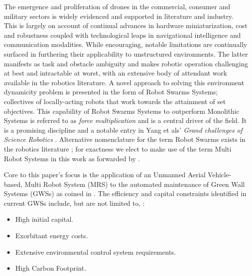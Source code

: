 \documentclass{report}
\begin{document}
The emergence and proliferation of drones in the commercial, consumer and military sectors is widely evidenced and supported in literature and industry. This is largely on account of continual advances in hardware miniaturization, cost and robustness coupled with technological leaps in navigational intelligence and communication modalities. While encouraging, notable limitations are continually surfaced in furthering their applicability to unstructured environments. The latter manifests as task and obstacle ambiguity and makes robotic operation challenging at best and intractable at worst, with an extensive body of attendant work available in the robotics literature. A novel approach to solving this environment dynamicity problem is presented in the form of Robot Swarms Systems; collectives of locally-acting robots that work towards the attainment of set objectives. This capability of Robot Swarms Systems to outperform Monolithic Systems is referred to as \textit{force multiplication} \cite{Yang2018} and is a central driver of the field. It is a promising discipline and a notable entry in Yang et als' \textit{Grand challenges of Science Robotics} \cite{Yang2018}. Alternative nomenclature for the term Robot Swarms exists in the robotics literature \cite{Beni2005a} \cite{Sahin2005} \cite{Iocchi2001}; for exactness we elect to make use of the term Multi Robot Systems in this work as forwarded by \cite{Iocchi2001}.

Core to this paper's focus is the application of an Unmanned Aerial Vehicle-based, Multi Robot System (MRS) to the automated maintenance of Green Wall Systems (GWSs) as coined in \cite{Perini2011}. The efficiency and capital constraints identified in current GWSs include, but are not limited to, \cite{Holt2018}:
\begin{itemize}
	\item High initial capital.
	\item Exorbitant energy costs.
	\item Extensive environmental control system requirements.
	\item High Carbon Footprint.
\end{itemize}
\end{document}
